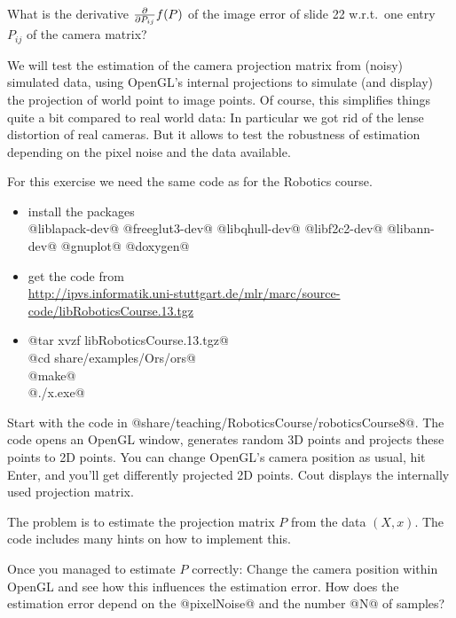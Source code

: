 

\renewcommand{\course}{Robotics}
\renewcommand{\coursepicture}{roboticsLecture}
\renewcommand{\coursedate}{Winter 2014}
\renewcommand{\exnum}{14}

\exercises


\exercisestitle



What is the derivative $\frac{\partial}{\partial P_{ij}} f(P)$ of the image error
of slide 22 w.r.t.\ one entry $P_{ij}$ of the camera matrix?



We will test the estimation of the camera projection matrix from
(noisy) simulated data, using OpenGL's internal projections to
simulate (and display) the projection of world point to image
points. Of course, this simplifies things quite a bit compared to real
world data: In particular we got rid of the lense distortion of real
cameras. But it allows to test the robustness of estimation
depending on the pixel noise and the data available.

For this exercise we need the same code as for the Robotics course.
\begin{itemize}
\item install the packages \\ {\small @liblapack-dev@ @freeglut3-dev@
@libqhull-dev@ @libf2c2-dev@ @libann-dev@ @gnuplot@ @doxygen@}
\item get the code
from \\ {\small\url{http://ipvs.informatik.uni-stuttgart.de/mlr/marc/source-code/libRoboticsCourse.13.tgz}}
\item {\small
@tar xvzf libRoboticsCourse.13.tgz@\\
@cd share/examples/Ors/ors@\\
@make@\\
@./x.exe@

}
\end{itemize}

Start with the code in @share/teaching/RoboticsCourse/roboticsCourse8@. The
code opens an OpenGL window, generates random 3D points and projects
these points to 2D points. You can change OpenGL's camera position as
usual, hit Enter, and you'll get differently projected 2D points. Cout
displays the internally used projection matrix.

The problem is to estimate the projection matrix $P$ from the data
$(X,x)$. The code includes many hints on how to implement this.

Once you managed to estimate $P$ correctly: Change the camera position
within OpenGL and see how this influences the estimation error. How
does the estimation error depend on the @pixelNoise@ and the
number @N@ of samples?


\exerfoot
